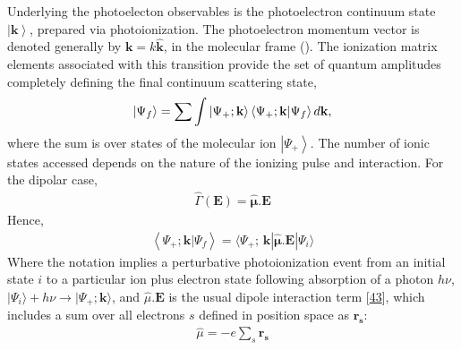 \documentclass[letterpaper,table,10pt,english]{jupyterBook}
\begin{document}
\sphinxAtStartPar
Underlying the photoelecton observables is the photoelectron continuum state \(\left|\mathbf{k}\right>\), prepared via photoionization. The photoelectron momentum vector is denoted generally by
\(\boldsymbol{\mathbf{k}}=k\mathbf{\hat{k}}\), in the molecular frame ({\hyperref[\detokenize{backmatter/glossary:term-MF}]{}}). The ionization matrix elements associated with this transition provide the set of quantum amplitudes completely defining the final continuum scattering state,
\begin{equation}\label{equation:part1/theory_photoionization_dynamics_191122:eq:continuum-state-vec}
\begin{split}\left|\Psi_f\right> = \sum{\int{\left|\Psi_{+};\bf{k}\right>\left<\Psi_{+};\mathbf{k}|\Psi_f\right> d\bf{k}}},
\end{split}
\end{equation}
\sphinxAtStartPar
where the sum is over states of the molecular ion \(\left|\Psi_{+}\right>\). The number of ionic states accessed depends on the nature of the ionizing pulse and interaction. For the dipolar case,
\begin{equation}\label{equation:part1/theory_photoionization_dynamics_191122:eq:def-dipole-operator}
\begin{split}\hat{\Gamma}(\boldsymbol{\mathbf{E}}) = \hat{\boldsymbol{\mu}}.\boldsymbol{\mathbf{E}}\end{split}
\end{equation}
\sphinxAtStartPar
Hence,
\begin{equation}\label{equation:part1/theory_photoionization_dynamics_191122:eq:matE-dipole}
\begin{split}\left<\Psi_{+};\mathbf{k}|\Psi_f\right> =\langle\Psi_{+};\,\mathbf{k}|\hat{\boldsymbol{\mu}}.\boldsymbol{\mathbf{E}}|\Psi_{i}\rangle
\end{split}
\end{equation}
\sphinxAtStartPar
Where the notation implies a perturbative photoionization event from an initial state \(i\) to a particular ion plus electron state following absorption of a photon \(h\nu\), \(|\Psi_{i}\rangle+h\nu{\rightarrow}|\Psi_{+};\boldsymbol{\mathbf{k}}\rangle\), and \(\hat{\mu}.\boldsymbol{\mathbf{E}}\) is the usual dipole interaction term {[}\hyperlink{cite.backmatter/bibliography:id745}{43}{]}, which includes a sum over all electrons \(s\) defined in position space as \(\mathbf{r_{s}}\):
\begin{equation}\label{equation:part1/theory_photoionization_dynamics_191122:eq:dipole-operator}
\begin{split}\hat{\mu}=-e\sum_{s}\mathbf{r_{s}}
\end{split}
\end{equation}
\end{document}
